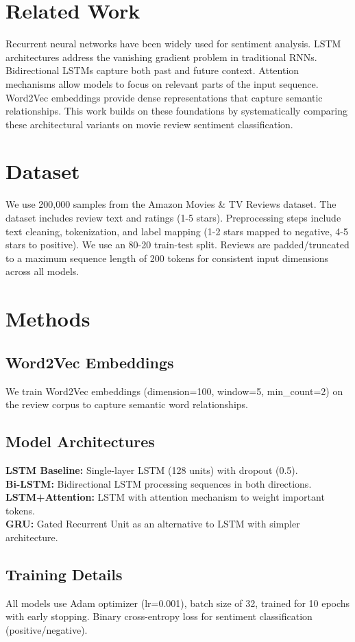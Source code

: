 \documentclass[conference]{IEEEtran}
\begin{document}
\section{Related Work}
\label{sec:related}
Recurrent neural networks have been widely used for sentiment analysis. LSTM architectures address the vanishing gradient problem in traditional RNNs. Bidirectional LSTMs capture both past and future context. Attention mechanisms allow models to focus on relevant parts of the input sequence. Word2Vec embeddings provide dense representations that capture semantic relationships. This work builds on these foundations by systematically comparing these architectural variants on movie review sentiment classification.

\section{Dataset}
\label{sec:dataset}
We use 200,000 samples from the Amazon Movies \& TV Reviews dataset. The dataset includes review text and ratings (1-5 stars). Preprocessing steps include text cleaning, tokenization, and label mapping (1-2 stars mapped to negative, 4-5 stars to positive). We use an 80-20 train-test split. Reviews are padded/truncated to a maximum sequence length of 200 tokens for consistent input dimensions across all models.

\section{Methods}
\label{sec:methods}
\subsection{Word2Vec Embeddings}
We train Word2Vec embeddings (dimension=100, window=5, min\_count=2) on the review corpus to capture semantic word relationships.
\subsection{Model Architectures}
\textbf{LSTM Baseline:} Single-layer LSTM (128 units) with dropout (0.5).\\
\textbf{Bi-LSTM:} Bidirectional LSTM processing sequences in both directions.\\
\textbf{LSTM+Attention:} LSTM with attention mechanism to weight important tokens.\\
\textbf{GRU:} Gated Recurrent Unit as an alternative to LSTM with simpler architecture.
\subsection{Training Details}
All models use Adam optimizer (lr=0.001), batch size of 32, trained for 10 epochs with early stopping. Binary cross-entropy loss for sentiment classification (positive/negative).
\end{document}
